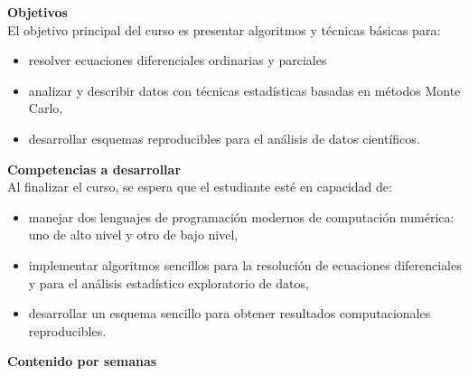 \documentclass[letterpaper,10pt,onecolumn]{article}
\begin{document}
\noindent\textbf{\large {} \quad Objetivos}\\[-0.2cm]

\noindent\normalsize El objetivo principal del curso es presentar
algoritmos y t\'ecnicas b\'asicas para:

\begin{itemize}
\item resolver ecuaciones
  diferenciales ordinarias y parciales\\[-0.6cm]
\item analizar y describir datos con t\'ecnicas estad\'isticas basadas
  en m\'etodos Monte Carlo, \\[-0.6cm]
\item desarrollar esquemas reproducibles para el an\'alisis de datos cient\'ificos. \\[-0.6cm]
\end{itemize}

\noindent\textbf{\large {} \quad Competencias a
  desarrollar}\\[-0.2cm] 


\noindent\normalsize Al finalizar el curso, se espera que el
estudiante est\'e en capacidad de: 

\begin{itemize}
\item manejar dos lenguajes de programaci\'on modernos de
  computaci\'on num\'erica: uno de alto
  nivel y otro de bajo nivel,\\[-0.6cm] 
\item implementar algoritmos sencillos para la resoluci\'on de
  ecuaciones diferenciales y para el an\'alisis estad\'istico
  exploratorio de datos, \\[-0.6cm]   
\item desarrollar un esquema sencillo para obtener resultados
  computacionales reproducibles.\\[-0.6cm]  
\end{itemize}

\noindent\textbf{\large {} \quad Contenido por
  semanas}\\[-0.2cm]  

\end{document}
